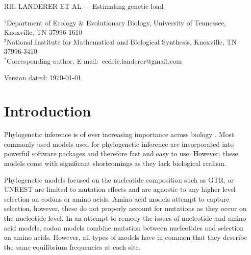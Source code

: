 \documentclass[12pt]{article}
\begin{document}
\doublespacing
\linenumbers


\newcommand{\Lik}{\ensuremath{\text{\emph{L}}}\xspace}
\newcommand{\selacDMS}{\emph{SelAC}+DMS\xspace}
\newcommand{\phydms}{\emph{phydms}\xspace}
\newcommand{\selac}{\emph{SelAC}\xspace}
\newcommand{\ecoli}{\textit{E. coli}\xspace}
\newcommand{\gy}{\emph{GY94}\xspace}

\noindent RH: LANDERER ET AL.--- Estimating genetic load
\bigskip
\medskip
\begin{center}

\bigskip



\end{center}

\vfill

{\small
\noindent$^{1}$Department of Ecology \& Evolutionary Biology, University of Tennessee, Knoxville, TN 37996-1610\\
\noindent$^{2}$National Institute for Mathematical and Biological Synthesis, Knoxville, TN 37996-3410\\
\noindent$^{*}$Corresponding author. E-mail:~cedric.landerer@gmail.com
}

\vfill
\centerline{Version dated: \today}
\vfill
\newpage


\section*{Introduction}
Phylogenetic inference is of ever increasing importance across biology \citep{Ruprecht2017}. 
Most commonly used models used for phylogenetic inference are incorporated into powerful software packages \citep{raxml, revbayes, nguyen2015} and therefore fast and easy to use.
However, these models come with significant shortcomings as they lack biological realism.

Phylogenetic models focused on the nucleotide composition such as GTR, or UNREST \citep{Tavare1986,Yang1994} are limited to mutation effects and are agnostic to any higher level selection on codons or amino acids.
Amino acid models attempt to capture selection, however, these do not properly account for mutations as they occur on the nucleotide level.
In an attempt to remedy the issues of nucleotide and amino acid models, codon models combine mutation between nucleotides and selection on amino acids.
However, all types of models have in common that they describe the same equilibrium frequencies at each site.
\end{document}
